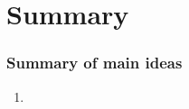 \documentclass[slidestop,compress,mathserif,12pt,t,professionalfonts,xcolor=table]{beamer}
\begin{document}

\section{Summary}


\begin{frame}
\frametitle{Summary of main ideas}

\vfill

\begin{enumerate}

\item {}

\end{enumerate}

\vfill

\end{frame}

\end{document}
